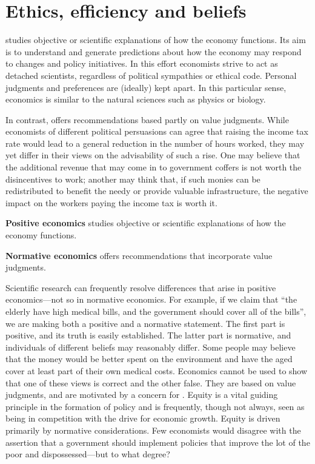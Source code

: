 \section{Ethics, efficiency and beliefs}\label{sec:ch2sec5}

 studies objective or scientific explanations of how the economy functions. Its aim is to understand and generate predictions about how the economy may respond to changes and policy initiatives. In this effort economists strive to act as detached scientists, regardless of political sympathies or ethical code. Personal judgments and preferences are (ideally) kept apart. In this particular sense, economics is similar to the natural sciences such as physics or biology.

In contrast,  offers recommendations based partly on value judgments. While economists of different political persuasions can agree that raising the income tax rate would lead to a general reduction in the number of hours worked, they may yet differ in their views on the advisability of such a rise. One may believe that the additional revenue that may come in to government coffers is not worth the disincentives to work; another may think that, if such monies can be redistributed to benefit the needy or provide valuable infrastructure, the negative impact on the workers paying the income tax is worth it.

\begin{DefBox}
\textbf{Positive economics} studies objective or scientific explanations of how the economy functions.

\textbf{Normative economics} offers recommendations that incorporate value judgments.
\end{DefBox}

Scientific research can frequently resolve differences that arise in positive economics---not so in normative economics. For example, if we claim that ``the elderly have high medical bills, and the government should cover all of the bills'', we are making both a positive and a normative statement. The first part is positive, and its truth is easily established. The latter part is normative, and individuals of different beliefs may reasonably differ. Some people may believe that the money would be better spent on the environment and have the aged cover at least part of their own medical costs. Economics cannot be used to show that one of these views is correct and the other false. They are based on value judgments, and are motivated by a concern for . Equity is a vital guiding principle in the formation of policy and is frequently, though not always, seen as being in competition with the drive for economic growth. Equity is driven primarily by normative considerations. Few economists would disagree with the assertion that a government should implement policies that improve the lot of the poor and dispossessed---but to what degree?

